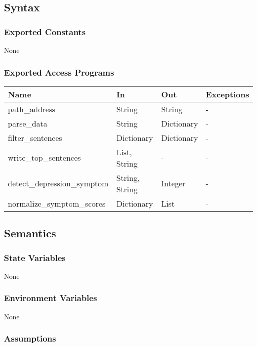 \documentclass[12pt, titlepage]{article}
\begin{document}
\subsection{Syntax}

\subsubsection{Exported Constants}

None 


\subsubsection{Exported Access Programs}

\begin{center}
\begin{tabular}{p{5cm} p{4.5cm} p{3cm} p{2cm}}
\hline
\textbf{Name} & \textbf{In} & \textbf{Out} & \textbf{Exceptions} \\
\hline
path\_address & String & String & - \\
parse\_data & String & Dictionary & - \\
filter\_sentences & Dictionary & Dictionary & - \\
write\_top\_sentences & List, String & - & - \\ 
detect\_depression\_symptom & String, String & Integer & - \\ 
normalize\_symptom\_scores & Dictionary & List & - \\ 

\hline
\end{tabular}
\end{center}

\subsection{Semantics}

\subsubsection{State Variables}

None

\subsubsection{Environment Variables}

None

\subsubsection{Assumptions}
\end{document}
